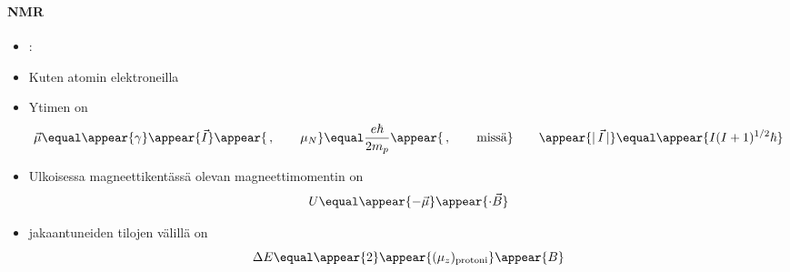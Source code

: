\begin{frame}
\frametitle{\texorpdfstring{\culine[\sectiontitleulinecolor]{\sectiontitle}}{\sectiontitle} }
\framesubtitle{NMR}
\appear{}

\begin{itemize}
	\item[] :
	
	\item Kuten  atomin elektroneilla

\item Ytimen  on  
\[
\vec{\mu}  \equal \appear{\gamma} \appear{\vec{I}} \appear{\,, \qquad \mu_{N}}  \equal \frac{e \hbar}{2 m_{p}} \appear{\,, \qquad \text{missä}} \qquad \appear{|\, \vec{I} \,|}  \equal  \appear{I(I+1)^{1 / 2} \hbar}
\]

\item Ulkoisessa magneettikentässä olevan magneettimomentin  on
\[
U  \equal \appear{-\vec{\mu}} \appear{\cdot \vec{B}}
\]

\item {} jakaantuneiden tilojen välillä on
\[
\Delta E  \equal \appear{2} \appear{( \mu_{z} )_{\text {protoni}}} \appear{B}
\]
\end{itemize}

\endofslide 
\end{frame}

